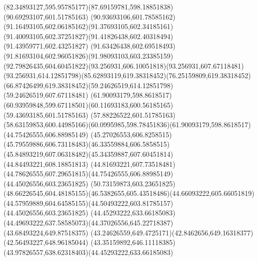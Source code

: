 {{	\curveto(82.34893127,595.95785177)(87.69159781,598.18851838)(90.69293107,601.51785163)
	\curveto(90.93693106,601.78585162)(91.16493105,602.06185162)(91.37693105,602.34185161)
	\curveto(91.40093105,602.37251827)(91.41826438,602.40318494)(91.43959771,602.43251827)
	\curveto(91.63426438,602.69518493)(91.81693104,602.96051826)(91.98093103,603.23385159)
	\curveto(92.79826435,604.60451822)(93.256931,606.10051818)(93.256931,607.67118481)
	\curveto(93.256931,614.12851798)(85.62893119,619.38318452)(76.25159809,619.38318452)
	\curveto(66.87426499,619.38318452)(59.24626519,614.12851798)(59.24626519,607.67118481)
	\moveto(61.90093179,598.8618517)
	\curveto(60.93959848,599.67118501)(60.11693183,600.56185165)(59.43693185,601.51785163)
	\lineto(57.88226522,601.51785163)
	\curveto(58.63159853,600.44985166)(60.0995985,598.78451836)(61.90093179,598.8618517)
	\moveto(44.75426555,606.88985149)
	\curveto(45.27026553,606.8258515)(45.79559886,606.73118483)(46.33559884,606.5858515)
	\curveto(45.84893219,607.06318482)(45.34359887,607.60451814)(44.84493221,608.18851813)
	\curveto(44.81693221,607.73518481)(44.78626555,607.29651815)(44.75426555,606.88985149)
	\moveto(44.45026556,603.23651825)
	\lineto(50.73159873,603.23651825)
	\curveto(48.66226545,604.48185155)(46.5382655,605.43518486)(44.66093222,605.66051819)
	\curveto(44.57959889,604.64585155)(44.50493222,603.81785157)(44.45026556,603.23651825)
	\moveto(44.45293222,633.66185083)
	\curveto(44.49693222,637.58585073)(44.37026556,645.22718387)(43.68493224,649.87518375)
	\curveto(43.24626559,649.4725171)(42.8462656,649.16318377)(42.56493227,648.96185044)
	\curveto(43.35159892,646.11118385)(43.97826557,638.62318403)(44.45293222,633.66185083)
}
}
{
}

